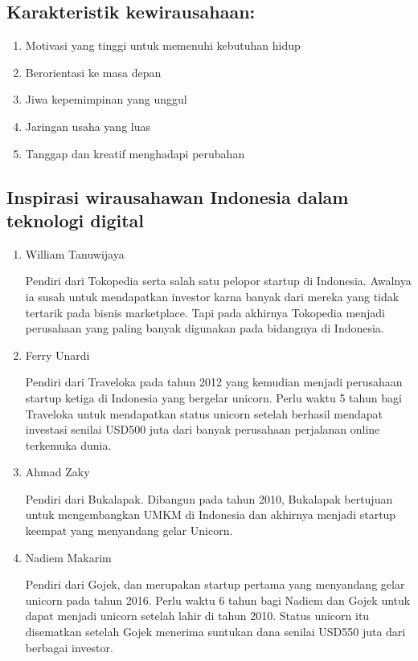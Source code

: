 \hypertarget{karakteristik-kewirausahaan}{%
\subsection{Karakteristik
kewirausahaan:}\label{karakteristik-kewirausahaan}}

\begin{enumerate}
\def\labelenumi{\arabic{enumi}.}
\tightlist
\item
  Motivasi yang tinggi untuk memenuhi kebutuhan hidup
\item
  Berorientasi ke masa depan
\item
  Jiwa kepemimpinan yang unggul
\item
  Jaringan usaha yang luas
\item
  Tanggap dan kreatif menghadapi perubahan
\end{enumerate}

\hypertarget{inspirasi-wirausahawan-indonesia-dalam-teknologi-digital}{%
\subsection{Inspirasi wirausahawan Indonesia dalam teknologi
digital}\label{inspirasi-wirausahawan-indonesia-dalam-teknologi-digital}}

\begin{enumerate}
\def\labelenumi{\arabic{enumi}.}
\item
  William Tanuwijaya

  Pendiri dari Tokopedia serta salah satu pelopor startup di Indonesia.
  Awalnya ia susah untuk mendapatkan investor karna banyak dari mereka
  yang tidak tertarik pada bisnis marketplace. Tapi pada akhirnya
  Tokopedia menjadi perusahaan yang paling banyak digunakan pada
  bidangnya di Indonesia.
\item
  Ferry Unardi

  Pendiri dari Traveloka pada tahun 2012 yang kemudian menjadi
  perusahaan startup ketiga di Indonesia yang bergelar unicorn. Perlu
  waktu 5 tahun bagi Traveloka untuk mendapatkan status unicorn setelah
  berhasil mendapat investasi senilai USD500 juta dari banyak perusahaan
  perjalanan online terkemuka dunia.
\item
  Ahmad Zaky

  Pendiri dari Bukalapak. Dibangun pada tahun 2010, Bukalapak bertujuan
  untuk mengembangkan UMKM di Indonesia dan akhirnya menjadi startup
  keempat yang menyandang gelar Unicorn.
\item
  Nadiem Makarim

  Pendiri dari Gojek, dan merupakan startup pertama yang menyandang
  gelar unicorn pada tahun 2016. Perlu waktu 6 tahun bagi Nadiem dan
  Gojek untuk dapat menjadi unicorn setelah lahir di tahun 2010. Status
  unicorn itu disematkan setelah Gojek menerima suntukan dana senilai
  USD550 juta dari berbagai investor.
\end{enumerate}
